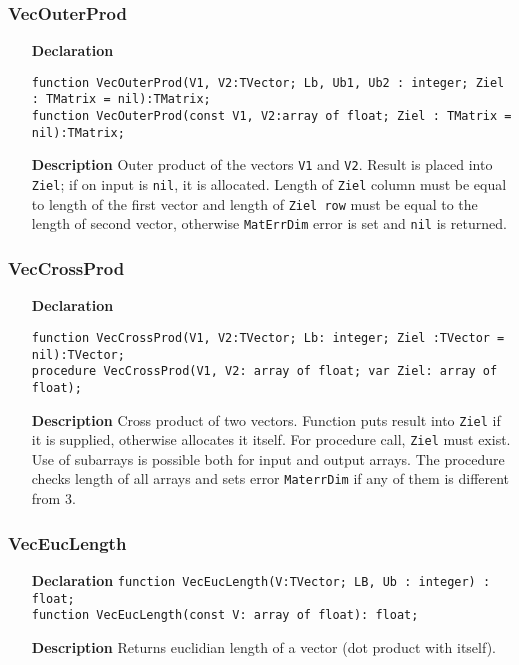 \documentclass[12pt,a4paper,oneside]{report}
\newcommand{\declarationitem}[1]{\textbf{#1}}
\newcommand{\descriptiontitle}[1]{\textbf{#1}}
\newcommand{\code}[1]{\texttt{#1}}
\begin{document}
\subsubsection{VecOuterProd}
\label{VecOuterProd}
\begin{itemize}
	\item[\declarationitem{Declaration}\hfill]
	\begin{flushleft}
	\code{function VecOuterProd(V1, V2:TVector; Lb, Ub1, Ub2 : integer; Ziel : TMatrix = nil):TMatrix;}\\
	\code{function VecOuterProd(const V1, V2:array of float; Ziel : TMatrix = nil):TMatrix;}
	\end{flushleft}
	\item[\descriptiontitle{Description}]Outer product of the vectors \code{V1} and \code{V2}. Result is placed into \code{Ziel}; if on input is \code{nil}, it is allocated. Length of \code{Ziel} column must be equal to length of the first vector and length of \code{Ziel row} must be equal to the length of second vector, otherwise \code{MatErrDim} error is set and \code{nil} is returned.
\end{itemize}
\subsubsection{VecCrossProd}
\label{VecCrossProd}
\begin{itemize}
\item[\declarationitem{Declaration}\hfill]
\begin{flushleft}\code{function VecCrossProd(V1, V2:TVector; Lb: integer; Ziel :TVector = nil):TVector;}\\
	\code{procedure VecCrossProd(V1, V2: array of float; var Ziel: array of float);}
\end{flushleft}
\item[\descriptiontitle{Description}] Cross product of two vectors. Function puts result into \code{Ziel} if it is supplied, otherwise allocates it itself. For procedure call, \code{Ziel} must exist. Use of subarrays is possible both for input and output arrays. The procedure checks length of all arrays and sets error \code{MaterrDim} if any of them is different from 3.
\end{itemize}
\subsubsection{VecEucLength}
\label{VecEucLength}
\begin{itemize}
\item[\declarationitem{Declaration}\hfill]
\code{function VecEucLength(V:TVector; LB, Ub : integer) : float;}\\
\code{function VecEucLength(const V: array of float): float;}
\item[\descriptiontitle{Description}]Returns euclidian length of a vector (dot product with itself).
\end{itemize}
\end{document}
